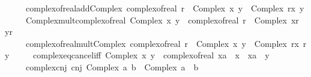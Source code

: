 \begin{isabellebody}
\ \ \ \ \ complex{\isacharunderscore}{\kern0pt}of{\isacharunderscore}{\kern0pt}real{\isacharunderscore}{\kern0pt}add{\isacharunderscore}{\kern0pt}Complex{\isacharcolon}{\kern0pt}\ {\isachardoublequoteopen}complex{\isacharunderscore}{\kern0pt}of{\isacharunderscore}{\kern0pt}real\ r\ {\isacharplus}{\kern0pt}\ Complex\ x\ y\ {\isacharequal}{\kern0pt}\ Complex\ {\isacharparenleft}{\kern0pt}r{\isacharplus}{\kern0pt}x{\isacharparenright}{\kern0pt}\ y{\isachardoublequoteclose}\isanewline
\ \ \ \ \ Complex{\isacharunderscore}{\kern0pt}mult{\isacharunderscore}{\kern0pt}complex{\isacharunderscore}{\kern0pt}of{\isacharunderscore}{\kern0pt}real{\isacharcolon}{\kern0pt}\ {\isachardoublequoteopen}Complex\ x\ y\ {\isacharasterisk}{\kern0pt}\ complex{\isacharunderscore}{\kern0pt}of{\isacharunderscore}{\kern0pt}real\ r\ {\isacharequal}{\kern0pt}\ Complex\ {\isacharparenleft}{\kern0pt}x{\isacharasterisk}{\kern0pt}r{\isacharparenright}{\kern0pt}\ {\isacharparenleft}{\kern0pt}y{\isacharasterisk}{\kern0pt}r{\isacharparenright}{\kern0pt}{\isachardoublequoteclose}\isanewline
\ \ \ \ \ complex{\isacharunderscore}{\kern0pt}of{\isacharunderscore}{\kern0pt}real{\isacharunderscore}{\kern0pt}mult{\isacharunderscore}{\kern0pt}Complex{\isacharcolon}{\kern0pt}\ {\isachardoublequoteopen}complex{\isacharunderscore}{\kern0pt}of{\isacharunderscore}{\kern0pt}real\ r\ {\isacharasterisk}{\kern0pt}\ Complex\ x\ y\ {\isacharequal}{\kern0pt}\ Complex\ {\isacharparenleft}{\kern0pt}r{\isacharasterisk}{\kern0pt}x{\isacharparenright}{\kern0pt}\ {\isacharparenleft}{\kern0pt}r{\isacharasterisk}{\kern0pt}y{\isacharparenright}{\kern0pt}{\isachardoublequoteclose}\isanewline
\ \ \ \ \ complex{\isacharunderscore}{\kern0pt}eq{\isacharunderscore}{\kern0pt}cancel{\isacharunderscore}{\kern0pt}iff{}{\isacharcolon}{\kern0pt}\ {\isachardoublequoteopen}{\isacharparenleft}{\kern0pt}Complex\ x\ y\ {\isacharequal}{\kern0pt}\ complex{\isacharunderscore}{\kern0pt}of{\isacharunderscore}{\kern0pt}real\ xa{\isacharparenright}{\kern0pt}\ {\isacharequal}{\kern0pt}\ {\isacharparenleft}{\kern0pt}x\ {\isacharequal}{\kern0pt}\ xa\ {\isasymand}\ y\ {\isacharequal}{\kern0pt}\ {}{\isacharparenright}{\kern0pt}{\isachardoublequoteclose}\isanewline
\ \ \ \ \ complex{\isacharunderscore}{\kern0pt}cnj{\isacharcolon}{\kern0pt}\ {\isachardoublequoteopen}cnj\ {\isacharparenleft}{\kern0pt}Complex\ a\ b{\isacharparenright}{\kern0pt}\ {\isacharequal}{\kern0pt}\ Complex\ a\ {\isacharparenleft}{\kern0pt}{\isacharminus}{\kern0pt}\ b{\isacharparenright}{\kern0pt}{\isachardoublequoteclose}\isanewline

\end{isabellebody}
